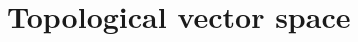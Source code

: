 \chapter{Topological vector space}
\def\O{\mathcal{O}}
\def\V{\mathcal{V}}
\def\N{\mathcal{N}}
\def\T{\mathcal{T}}
\def\F{\mathcal{F}}
\newcommand{\eqdef}{%
\ensuremath{\mathrel{\stackrel{\mathrm{def}}{=}}}}







